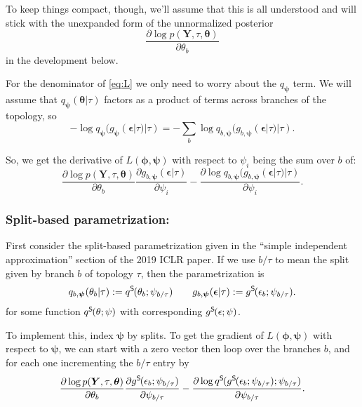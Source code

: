 \documentclass{article}
\newcommand{\qSplit}{q^\textsf{S}\hspace{-1pt}}
\newcommand{\gSplit}{g^\textsf{S}\hspace{-1pt}}
\begin{document}
To keep things compact, though, we'll assume that this is all understood and will stick with the unexpanded form of the unnormalized posterior
\[
    \frac{\partial \log p(\bm{Y}, \tau, \bm\theta)}{\partial \theta_b}
\]
in the development below.

For the denominator of \eqref{eq:L} we only need to worry about the $q_{\bm\psi}$ term.
We will assume that $q_{\bm\psi}(\bm\theta | \tau)$ factors as a product of terms across branches of the topology, so
\[
    - \log q_{\bm{\psi}}(g_{\bm{\psi}}(\bm{\epsilon}|\tau)|\tau) =
    - \sum_b \log q_{b, \bm{\psi}}(g_{b, \bm{\psi}}(\bm{\epsilon}|\tau)|\tau).
\]

So, we get the derivative of $L(\bm\phi, \bm\psi)$ with respect to $\psi_i$ being the sum over $b$ of:
\begin{equation}
    \frac{\partial \log p(\bm{Y}, \tau, \bm\theta)}{\partial \theta_b}
    \frac{\partial g_{b,\bm\psi}(\bm\epsilon | \tau)}{\partial \psi_i}
    - \frac{\partial \log q_{b, \bm\psi}(g_{b, \bm\psi}(\bm\epsilon|\tau)|\tau)}{\partial \psi_i}.
    \label{eq:dLdPsi}
\end{equation}

\subsubsection*{Split-based parametrization:}
First consider the split-based parametrization given in the ``simple independent approximation'' section of the 2019 ICLR paper.
If we use $b \slash \tau$ to mean the split given by branch $b$ of topology $\tau$, then the parametrization is
\[
q_{b, \bm{\psi}}(\theta_b | \tau) := \qSplit(\theta_b; \psi_{b \slash \tau})
\qquad
g_{b,\bm\psi}(\bm\epsilon | \tau) := \gSplit(\epsilon_b; \psi_{b \slash \tau}).
\]
for some function $\qSplit(\theta; \psi)$ with corresponding $\gSplit(\epsilon; \psi)$.

To implement this, index $\bm\psi$ by splits.
To get the gradient of $L(\bm\phi, \bm\psi)$ with respect to $\bm\psi$, we can start with a zero vector then loop over the branches $b$, and for each one incrementing the $b \slash \tau$ entry by
\begin{equation*}
    \frac{\partial \log p(\bm{Y}, \tau, \bm\theta)}{\partial \theta_b}
    \frac{\partial \gSplit(\epsilon_b; \psi_{b \slash \tau})}{\partial \psi_{b \slash \tau}}
    - \frac{\partial \log \qSplit(\gSplit(\epsilon_b; \psi_{b \slash \tau}); \psi_{b \slash \tau})}{\partial \psi_{b \slash \tau}}.
\end{equation*}
\end{document}
